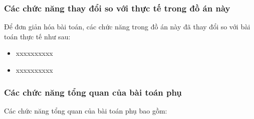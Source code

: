 \subsubsection{Các chức năng thay đổi so với thực tế trong đồ án này}

Để đơn giản hóa bài toán, các chức năng trong đồ án này đã thay đổi so với bài toán thực tế như sau:

\begin{itemize}

\item xxxxxxxxxx

\item xxxxxxxxxx

\end{itemize}

\subsubsection{Các chức năng tổng quan của bài toán phụ}

Các chức năng tổng quan của bài toán phụ bao gồm:

